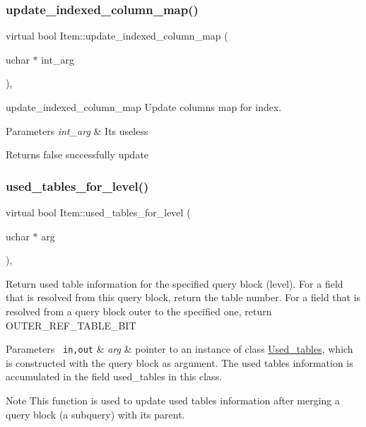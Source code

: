 \subsubsection{\texorpdfstring{update\+\_\+indexed\+\_\+column\+\_\+map()}{update\_indexed\_column\_map()}}
{\footnotesize\ttfamily virtual bool Item\+::update\+\_\+indexed\+\_\+column\+\_\+map (\begin{DoxyParamCaption}\item[{uchar $\ast$}]{int\+\_\+arg }\end{DoxyParamCaption})\hspace{0.3cm}{\ttfamily [inline]}, {\ttfamily [virtual]}}



update\+\_\+indexed\+\_\+column\+\_\+map Update columns map for index. 


\begin{DoxyParams}{Parameters}
{\em int\+\_\+arg} & It\textquotesingle{}s useless \\
\hline
\end{DoxyParams}
\begin{DoxyReturn}{Returns}
false successfully update 
\end{DoxyReturn}
\mbox{\label{classItem_af55c5ec69663eb6a1b98f071232a7aa2}} 
\subsubsection{\texorpdfstring{used\+\_\+tables\+\_\+for\+\_\+level()}{used\_tables\_for\_level()}}
{\footnotesize\ttfamily virtual bool Item\+::used\+\_\+tables\+\_\+for\+\_\+level (\begin{DoxyParamCaption}\item[{uchar $\ast$}]{arg }\end{DoxyParamCaption})\hspace{0.3cm}{\ttfamily [inline]}, {\ttfamily [virtual]}}

Return used table information for the specified query block (level). For a field that is resolved from this query block, return the table number. For a field that is resolved from a query block outer to the specified one, return O\+U\+T\+E\+R\+\_\+\+R\+E\+F\+\_\+\+T\+A\+B\+L\+E\+\_\+\+B\+IT


\begin{DoxyParams}[1]{Parameters}
\mbox{\texttt{ in,out}}  & {\em arg} & pointer to an instance of class \mbox{\hyperlink{classUsed__tables}{Used\+\_\+tables}}, which is constructed with the query block as argument. The used tables information is accumulated in the field used\+\_\+tables in this class.\\
\hline
\end{DoxyParams}
\begin{DoxyNote}{Note}
This function is used to update used tables information after merging a query block (a subquery) with its parent. 
\end{DoxyNote}


